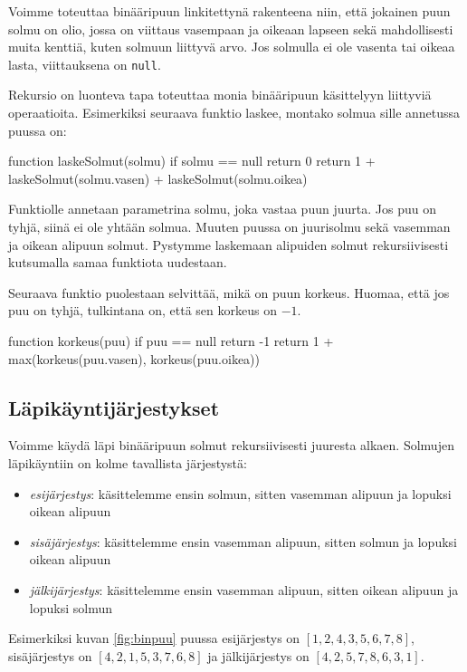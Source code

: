 Voimme toteuttaa binääripuun linkitettynä rakenteena niin,
että jokainen puun solmu on olio, jossa on viittaus
vasempaan ja oikeaan lapseen sekä mahdollisesti
muita kenttiä, kuten solmuun liittyvä arvo.
Jos solmulla ei ole vasenta tai oikeaa lasta,
viittauksena on \texttt{null}.

Rekursio on luonteva tapa toteuttaa monia
binääripuun käsittelyyn liittyviä operaatioita.
Esimerkiksi seuraava funktio laskee, montako solmua
sille annetussa puussa on:

\begin{code}
function laskeSolmut(solmu)
    if solmu == null
        return 0
    return 1 + laskeSolmut(solmu.vasen) +
                laskeSolmut(solmu.oikea)
\end{code}

Funktiolle annetaan parametrina solmu,
joka vastaa puun juurta.
Jos puu on tyhjä, siinä ei ole yhtään solmua.
Muuten puussa on juurisolmu sekä vasemman
ja oikean alipuun solmut.
Pystymme laskemaan alipuiden solmut rekursiivisesti
kutsumalla samaa funktiota uudestaan.

Seuraava funktio puolestaan selvittää, mikä on puun korkeus.
Huomaa, että jos puu on tyhjä, tulkintana on,
että sen korkeus on $-1$.

\begin{code}
function korkeus(puu)
    if puu == null
        return -1
    return 1 + max(korkeus(puu.vasen), korkeus(puu.oikea))
\end{code}

\subsection{Läpikäyntijärjestykset}

Voimme käydä läpi binääripuun solmut rekursiivisesti
juuresta alkaen.
Solmujen läpikäyntiin on kolme tavallista järjestystä:

\begin{itemize}
\item \emph{esijärjestys}: käsittelemme ensin solmun, sitten vasemman alipuun
ja lopuksi oikean alipuun
\item \emph{sisäjärjestys}: käsittelemme ensin vasemman alipuun, sitten solmun
ja lopuksi oikean alipuun
\item \emph{jälkijärjestys}: käsittelemme ensin vasemman alipuun,
sitten oikean alipuun ja lopuksi solmun
\end{itemize}

Esimerkiksi kuvan \ref{fig:binpuu} puussa
esijärjestys on $[1,2,4,3,5,6,7,8]$,
sisäjärjes\-tys on $[4,2,1,5,3,7,6,8]$ ja
jälkijärjestys on $[4,2,5,7,8,6,3,1]$.

